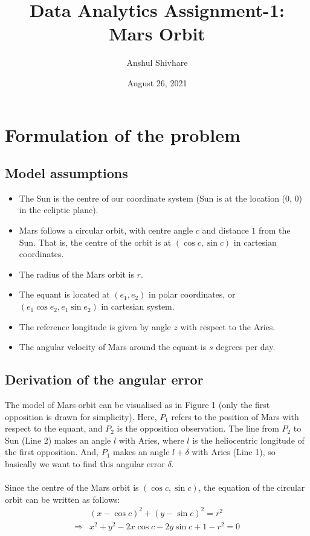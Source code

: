 \documentclass[11pt]{article}
\title{Data Analytics Assignment-1: Mars Orbit}
\author{Anshul Shivhare}
\date{August 26, 2021}
\begin{document}
\maketitle

\section{Formulation of the problem}\label{section-formulation}

\subsection{Model assumptions}
\begin{itemize}
    \item The Sun is the centre of our coordinate system (Sun is at the location (0, 0) in the ecliptic plane).
    \item Mars follows a circular orbit, with centre angle $c$ and distance $1$ from the Sun. That is, the centre of the orbit is at $(\cos{c}, \sin{c})$ in cartesian coordinates.
    \item The radius of the Mars orbit is $r$.
    \item The equant is located at $(e_1, e_2)$ in polar coordinates, or $(e_1 \cos{e_2}, e_1 \sin{e_2})$ in cartesian system.
    \item The reference longitude is given by angle $z$ with respect to the Aries.
    \item The angular velocity of Mars around the equant is $s$ degrees per day.
\end{itemize}

\subsection{Derivation of the angular error}

The model of Mars orbit can be visualised as in Figure 1 (only the first opposition is drawn for simplicity).  Here, $P_1$ refers to the position of Mars with respect to the equant, and $P_2$ is the opposition observation. The line from $P_2$ to Sun (Line 2) makes an angle $l$ with Aries, where $l$ is the heliocentric longitude of the first opposition. And, $P_1$ makes an angle $l + \delta$ with Aries (Line 1), so basically we want to find this angular error $\delta$.
\\
\\
Since the centre of the Mars orbit is $(\cos{c}, \sin{c})$, the equation of the circular orbit can be written as follows:
\begin{align*}
 &(x - \cos{c})^2 + (y - \sin{c})^2 = r^2\\
\Rightarrow & x^2 + y^2 - 2x\cos{c} -2y\sin{c} + 1 - r^2= 0
\end{align*}
\end{document}

